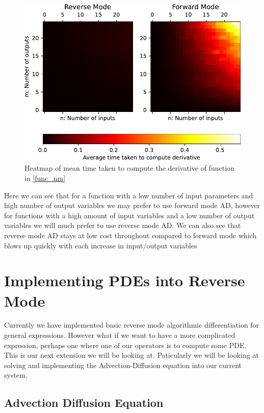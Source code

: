 \documentclass{article}
\begin{document}
\begin{figure}[h]
    \centering
    \includegraphics{images/Graph_HeatmapTimeDiff.pdf}
    \caption{Heatmap of mean time taken to compute the derivative of function in \eqref{func_nm}}
    \label{fig:heatmap}
\end{figure}

Here we can see that for a function with a low number of input parameters and high number of output variables we may prefer to use forward mode AD, however for functions with a high amount of input variables and a low number of output variables we will much prefer to use reverse mode AD. We can also see that reverse mode AD stays at low cost throughout compared to forward mode which blows up quickly with each increase in input/output variables



\newpage

\section{Implementing PDEs into Reverse Mode}

Currently we have implemented basic reverse mode algorithmic differentiation for general expressions. However what if we want to have a more complicated expression, perhaps one where one of our operators is to compute some PDE. This is our next extension we will be looking at. Paticularly we will be looking at solving and implementing the Advection-Diffusion equation into our current system.

\subsection{Advection Diffusion Equation}
\end{document}
